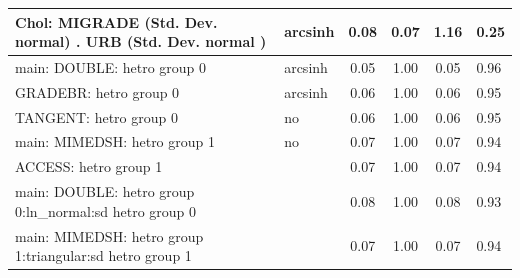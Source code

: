 \begin{table}
\begin{center}
\begin{tabular}{|l|l|c|c|c|l|}
			\hline
			 Chol: MIGRADE (Std. Dev. normal) . URB (Std. Dev.   normal ) & arcsinh & 0.08 & 0.07 & 1.16 & 0.25 \\
			\hline
			main: DOUBLE: hetro group 0 & arcsinh & 0.05 & 1.00 & 0.05 & 0.96 \\
			\hline
			GRADEBR: hetro group 0 & arcsinh & 0.06 & 1.00 & 0.06 & 0.95 \\
			\hline
			TANGENT: hetro group 0 & no & 0.06 & 1.00 & 0.06 & 0.95 \\
			\hline
			main: MIMEDSH: hetro group 1 & no & 0.07 & 1.00 & 0.07 & 0.94 \\
			\hline
			ACCESS: hetro group 1 &  & 0.07 & 1.00 & 0.07 & 0.94 \\
			\hline
			main: DOUBLE: hetro group 0:ln_normal:sd  hetro group 0 &  & 0.08 & 1.00 & 0.08 & 0.93 \\
			\hline
			main: MIMEDSH: hetro group 1:triangular:sd  hetro group 1 &  & 0.07 & 1.00 & 0.07 & 0.94 \\
			\hline
		\end{tabular}
	\end{center}
\end{table}